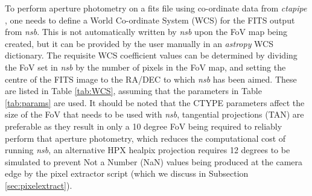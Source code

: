 To perform aperture photometry on a fits file using co-ordinate data from \textit{ctapipe} \cite{ctapipe2}, one needs to define a World Co-ordinate System (WCS) for the FITS output from \textit{nsb}. This is not automatically written by \textit{nsb} upon the FoV map being created, but it can be provided by the user manually in an \textit{astropy} WCS dictionary. The requisite WCS coefficient values can be determined by dividing the FoV set in \textit{nsb} by the number of pixels in the FoV map, and setting the centre of the FITS image to the RA/DEC to which \textit{nsb} has been aimed. These are listed in Table \ref{tab:WCS}, assuming that the parameters in Table \ref{tab:params} are used. It should be noted that the CTYPE parameters affect the size of the FoV that needs to be used with \textit{nsb}, tangential projections (TAN) are preferable as they result in only a 10 degree FoV being required to reliably perform that aperture photometry, which reduces the computational cost of running \textit{nsb}, an alternative HPX healpix projection requires 12 degrees to be simulated to prevent Not a Number (NaN) values being produced at the camera edge by the pixel extractor script (which we discuss in Subsection \ref{sec:pixelextract}).
